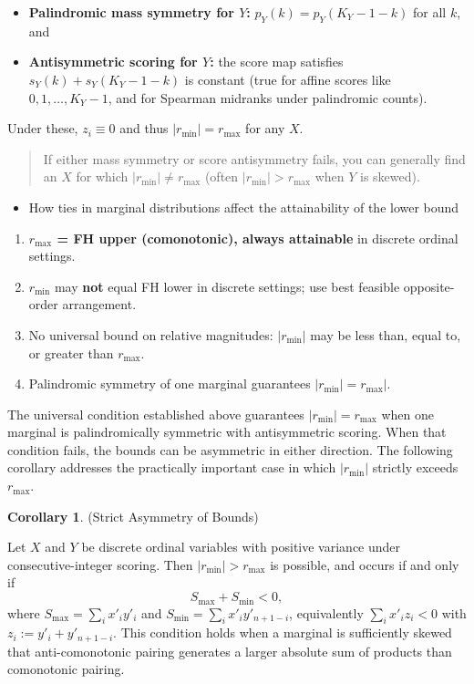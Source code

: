 \documentclass[
  12pt,
]{article}
\providecommand{\tightlist}{%
  \setlength{\itemsep}{0pt}\setlength{\parskip}{0pt}}
\theoremstyle{plain}
\theoremstyle{definition}
\newtheorem{corollary}{Corollary}
\theoremstyle{remark}
\begin{document}
\begin{itemize}
\item
  \textbf{Palindromic mass symmetry for \(Y\):} \(p_Y(k)=p_Y(K_Y-1-k)\)
  for all \(k\), and
\item
  \textbf{Antisymmetric scoring for \(Y\):} the score map satisfies
  \(s_Y(k)+s_Y(K_Y-1-k)\) is constant (true for affine scores like
  \(0,1,\dots,K_Y-1\), and for Spearman midranks under palindromic
  counts).
\end{itemize}

Under these, \(z_i\equiv 0\) and thus \(|r_{\min}|=r_{\max}\) for any
\(X\).

\begin{quote}
If either mass symmetry or score antisymmetry fails, you can generally
find an \(X\) for which \(|r_{\min}|\ne r_{\max}\) (often
\(|r_{\min}|>r_{\max}\) when \(Y\) is skewed).
\end{quote}

\begin{itemize}
\tightlist
\item
  How ties in marginal distributions affect the attainability of the
  lower bound
\end{itemize}

\begin{enumerate}
\def\labelenumi{\arabic{enumi}.}
\tightlist
\item
  \textbf{\(r_{\max}\) = FH upper (comonotonic), always attainable} in
  discrete ordinal settings.
\item
  \textbf{\(r_{\min}\)} may \textbf{not} equal FH lower in discrete
  settings; use best feasible opposite-order arrangement.
\item
  No universal bound on relative magnitudes: \(|r_{\min}|\) may be less
  than, equal to, or greater than \(r_{\max}\).
\item
  Palindromic symmetry of one marginal guarantees
  \(|r_{\min}| = r_{\max}|\).
\end{enumerate}

The universal condition established above guarantees
\(|r_{\min}| = r_{\max}\) when one marginal is palindromically symmetric
with antisymmetric scoring. When that condition fails, the bounds can be
asymmetric in either direction. The following corollary addresses the
practically important case in which \(|r_{\min}|\) strictly exceeds
\(r_{\max}\).

\label{corr-asymmetry}
\begin{corollary}{(Strict Asymmetry of Bounds)}

Let $X$ and $Y$ be discrete ordinal variables with positive variance under consecutive-integer scoring.
Then $|r_{\min}| > r_{\max}$ is possible, and occurs if and only if
$$
S_{\max} + S_{\min} < 0,
$$
where $S_{\max} = \sum_i x'_i y'_i$ and $S_{\min} = \sum_i x'_i y'_{n+1-i}$, equivalently $\sum_i x'_i z_i < 0$ with $z_i := y'_i + y'_{n+1-i}$.
This condition holds when a marginal is sufficiently skewed that anti-comonotonic pairing generates a larger absolute sum of products than comonotonic pairing.
\end{corollary}
\end{document}
